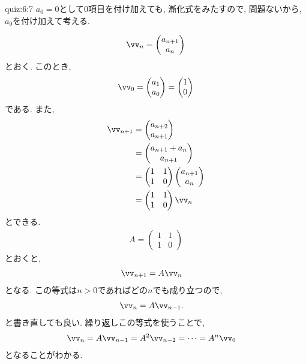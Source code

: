 \begin{answerof}{quiz:6:7}
$a_{0}=0$として$0$項目を付け加えても, 漸化式をみたすので,
問題ないから, $a_0$を付け加えて考える.

\begin{align*}
  \vv_n=\begin{pmatrix}a_{n+1}\\a_n\end{pmatrix}
\end{align*}
とおく.
このとき,
\begin{align*}
  \vv_0=\begin{pmatrix}a_{1}\\a_0\end{pmatrix}=\begin{pmatrix}1\\0\end{pmatrix}
\end{align*}
である.
また,
\begin{align*}
  \vv_{n+1}
  &=\begin{pmatrix}a_{n+2}\\a_{n+1}\end{pmatrix}\\
  &=\begin{pmatrix}a_{n+1}+a_n\\a_{n+1}\end{pmatrix}\\
  &=\begin{pmatrix}1&1\\1&0\end{pmatrix}\begin{pmatrix}a_{n+1}\\a_n\end{pmatrix}\\
  &=\begin{pmatrix}1&1\\1&0\end{pmatrix}\vv_n
\end{align*}
とできる.
\begin{align*}
A=\begin{pmatrix}1&1\\1&0\end{pmatrix}
\end{align*}
とおくと,
\begin{align*}
  \vv_{n+1}
  &=A\vv_{n}
\end{align*}
となる.
この等式は$n>0$であればどの$n$でも成り立つので,
\begin{align*}
  \vv_{n}
  &=A\vv_{n-1}.
\end{align*}
と書き直しても良い.
繰り返しこの等式を使うことで,
\begin{align*}
  \vv_{n}&=A\vv_{n-1}=A^2\vv_{n-2}
  =\cdots=A^{n}\vv_0
\end{align*}
となることがわかる.


\end{answerof}
